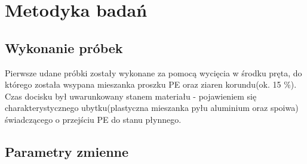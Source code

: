 \documentclass[magister,druk]{dyplom}
\begin{document}
\chapter{Metodyka badań}
\section{Wykonanie próbek}

Pierwsze udane próbki zostały wykonane za pomocą wycięcia w środku pręta, do którego została wsypana mieszanka proszku PE oraz ziaren korundu(ok. 15 \%). Czas docisku był uwarunkowany stanem materiału - pojawieniem się charakterystycznego ubytku(plastyczna mieszanka pyłu aluminium oraz spoiwa) świadczącego o przejściu PE do stanu płynnego. 

\section{Parametry zmienne}




\begin{table}[H]
	\centering
	\caption{Parametry zmienne w badaniach}
	\label{my-label}
\end{table}
\end{document}
